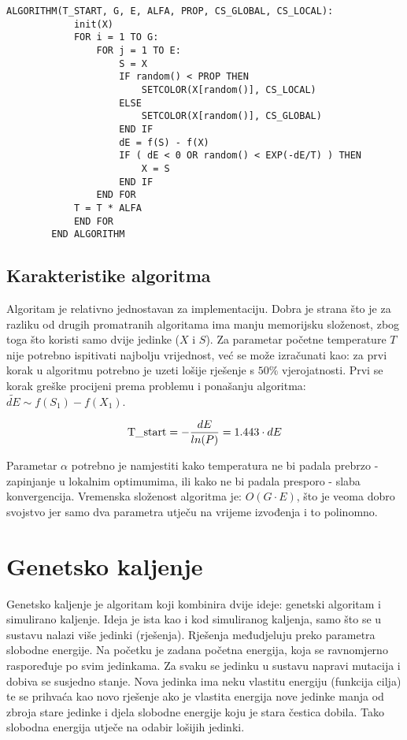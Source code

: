 \documentclass[times, utf8, diplomski, numeric]{fer}
\begin{document}
\begin{singlespace}
	\begin{lstlisting}[caption=Pseudok\^{o}d simuliranog kaljenja]
		ALGORITHM(T_START, G, E, ALFA, PROP, CS_GLOBAL, CS_LOCAL):
			init(X)
			FOR i = 1 TO G:
				FOR j = 1 TO E:
					S = X
					IF random() < PROP THEN
						SETCOLOR(X[random()], CS_LOCAL)
					ELSE
						SETCOLOR(X[random()], CS_GLOBAL)
					END IF
					dE = f(S) - f(X)
					IF ( dE < 0 OR random() < EXP(-dE/T) ) THEN
						X = S
					END IF
				END FOR
			T = T * ALFA
			END FOR
		END ALGORITHM
	\end{lstlisting}
\end{singlespace}

\subsection{Karakteristike algoritma}

Algoritam je relativno jednostavan za implementaciju. Dobra je strana što je za razliku od drugih promatranih algoritama ima manju memorijsku složenost, zbog toga što koristi samo dvije jedinke ($X$ i $S$). Za parametar početne temperature $T$ nije potrebno ispitivati najbolju vrijednost, već se može izračunati kao: za prvi korak u algoritmu potrebno je uzeti lošije rješenje s $50\%$ vjerojatnosti. Prvi se korak greške procijeni prema problemu i ponašanju algoritma: $\tilde{dE}\sim f(S_1)-f(X_1)$.  

\begin{equation}
\textup{T\_start} = -\frac{dE}{ln(P)} = 1.443 \cdot dE
\end{equation}  

Parametar $\alpha$ potrebno je namjestiti kako temperatura ne bi padala prebrzo - zapinjanje u lokalnim optimumima, ili kako ne bi padala presporo - slaba konvergencija. Vremenska složenost algoritma je: $O(G\cdot E)$, što je veoma dobro svojstvo jer samo dva parametra utječu na vrijeme izvođenja i to polinomno. 

\section{Genetsko kaljenje}

Genetsko kaljenje \cite{lit18} je algoritam koji kombinira dvije ideje: genetski algoritam i simulirano kaljenje. Ideja je ista kao i kod simuliranog kaljenja, samo što se u sustavu nalazi više jedinki (rješenja). Rješenja međudjeluju preko parametra slobodne energije. Na početku je zadana početna energija, koja se ravnomjerno raspoređuje po svim jedinkama. Za svaku se jedinku u sustavu napravi mutacija i dobiva se susjedno stanje. Nova jedinka ima neku vlastitu energiju (funkcija cilja) te se prihvaća kao novo rješenje ako je vlastita energija nove jedinke manja od zbroja stare jedinke i djela slobodne energije koju je stara čestica dobila. Tako slobodna energija utječe na odabir lošijih jedinki.
\end{document}
